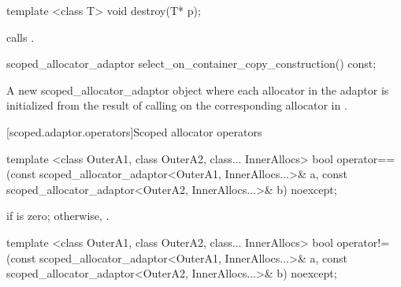 %
\begin{itemdecl}
template <class T>
  void destroy(T* p);
\end{itemdecl}

\begin{itemdescr}
\pnum
\effects calls .
\end{itemdescr}

%
%
\begin{itemdecl}
scoped_allocator_adaptor select_on_container_copy_construction() const;
\end{itemdecl}

\begin{itemdescr}
\pnum
\returns A new scoped_allocator_adaptor object where each allocator  in the
adaptor is initialized from the result of calling
 on the
corresponding allocator in .
\end{itemdescr}

[scoped.adaptor.operators]{Scoped allocator operators}

%
%
\begin{itemdecl}
template <class OuterA1, class OuterA2, class... InnerAllocs>
  bool operator==(const scoped_allocator_adaptor<OuterA1, InnerAllocs...>& a,
                  const scoped_allocator_adaptor<OuterA2, InnerAllocs...>& b) noexcept;
\end{itemdecl}

\begin{itemdescr}
\pnum
\returns {} if
 is zero;
otherwise, 
\tcode{\&\&} .
\end{itemdescr}

%
%
\begin{itemdecl}
template <class OuterA1, class OuterA2, class... InnerAllocs>
  bool operator!=(const scoped_allocator_adaptor<OuterA1, InnerAllocs...>& a,
                  const scoped_allocator_adaptor<OuterA2, InnerAllocs...>& b) noexcept;
\end{itemdecl}


